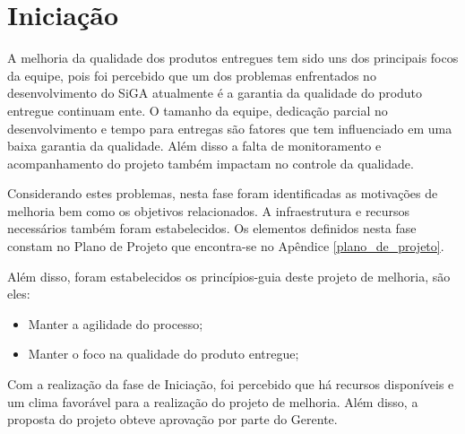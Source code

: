 \chapter{Iniciação} \label{cap:iniciacao}

A melhoria da qualidade dos produtos entregues tem sido uns dos principais focos da equipe, pois 
foi percebido que um dos problemas enfrentados 
no desenvolvimento do SiGA atualmente é a garantia da qualidade
do produto entregue continuam	ente. O tamanho da equipe, dedicação parcial no
desenvolvimento e tempo para entregas são fatores que tem influenciado em uma baixa garantia da qualidade. 
Além disso a falta de monitoramento e acompanhamento do projeto também impactam no controle da qualidade. 

Considerando estes problemas, nesta fase foram identificadas as motivações de melhoria bem como os objetivos relacionados. 
A infraestrutura e recursos necessários também foram estabelecidos. 
Os elementos definidos nesta fase constam no Plano de Projeto que encontra-se no Apêndice \ref{plano_de_projeto}. 

Além disso, foram estabelecidos os princípios-guia deste projeto de melhoria, são eles:

\begin{itemize}
 \item Manter a agilidade do processo;
 \item Manter o foco na qualidade do produto entregue;
\end{itemize}

Com a realização da fase de Iniciação, foi percebido que há recursos disponíveis e um clima favorável para a realização do projeto de melhoria.
Além disso, a proposta do projeto obteve aprovação por parte do Gerente.